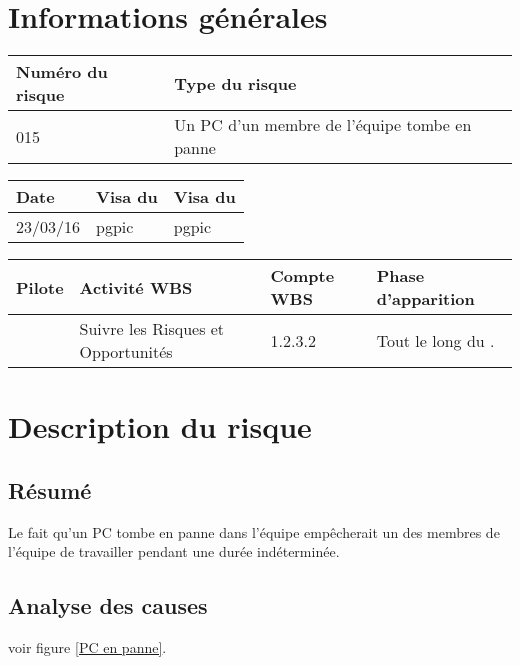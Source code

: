 
\section*{Informations générales}

\begin{table}[H]
\centering
	\begin{tabularx}{16.8cm}{|X|X|}
	\hline
	\rowcolor{gray!40} Numéro du risque & Type du risque \\
	\hline
	015 & Un PC d’un membre de l’équipe tombe en panne \\
	\hline
	\end{tabularx}
\end{table}

\begin{table}[H]
\centering
	\begin{tabularx}{16.8cm}{|X|X|X|}
	\hline
	\rowcolor{gray!40} Date & Visa du \RQ & Visa du \CP \\
	\hline
	 23/03/16 & pgpic & pgpic \\
	\hline
	\end{tabularx}
\end{table}

\begin{table}[H]
\centering
	\begin{tabularx}{16.8cm}{|X|X|X|X|}
	\hline
	\rowcolor{gray!40} Pilote & Activité WBS & Compte WBS & Phase d'apparition \\
	\hline
	 \Sergi & Suivre les Risques et Opportunités & 1.2.3.2 & Tout le long du \PICCourt. \\
	\hline
	\end{tabularx}
\end{table}

\section*{Description du risque}

\subsection*{Résumé}
	Le fait qu'un PC tombe en panne dans l'équipe empêcherait un des membres de l'équipe de travailler pendant une durée indéterminée.
	
\subsection*{Analyse des causes}
	voir figure \ref{PC en panne}.

